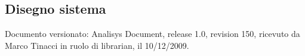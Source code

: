 \subsection{Disegno sistema}
Documento versionato: Analisys Document, release 1.0, revision 150, ricevuto da
Marco Tinacci in ruolo di librarian, il 10/12/2009.